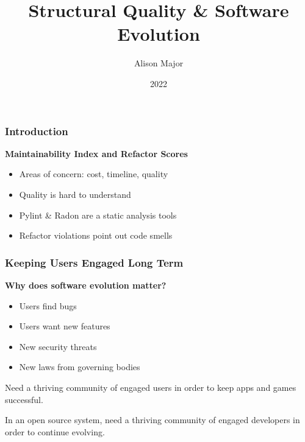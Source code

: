 \documentclass{beamer}
\title{Structural Quality \& Software Evolution}
\author{Alison Major}
\institute{Lewis University}
\date{2022}
\begin{document}
\frame{\titlepage}

\begin{frame}
  \frametitle{Introduction}
  \textbf{Maintainability Index and Refactor Scores}
  \begin{itemize}
    \vspace{0.35cm}
    \item Areas of concern: cost, timeline, quality
    
    \vspace{0.35cm}
    \item Quality is hard to understand
    
    \vspace{0.35cm}
    \item Pylint \& Radon are a static analysis tools
    
    \vspace{0.35cm}
    \item Refactor violations point out code smells
  \end{itemize}
\end{frame}


\begin{frame}
  \frametitle{Keeping Users Engaged Long Term}
  \textbf{Why does software evolution matter?}
  \begin{itemize}
    \item Users find bugs
    \item Users want new features
    \item New security threats
    \item New laws from governing bodies
  \end{itemize}
  
  \vspace{0.5cm}
  Need a thriving community of engaged users in order to keep apps and games successful.

  \vspace{0.35cm}
  In an open source system, need a thriving community of engaged developers in order to continue evolving.
\end{frame}
\end{document}
